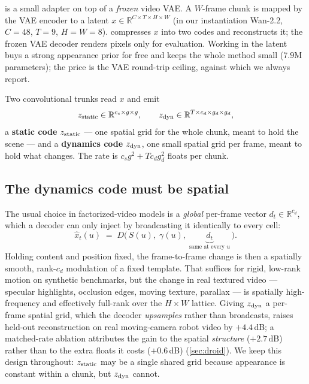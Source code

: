 
\method{} is a small adapter on top of a \emph{frozen} video VAE. A $W$-frame chunk is
mapped by the VAE encoder to a latent $x \in \mathbb{R}^{C\times T\times H\times W}$
(in our instantiation Wan-2.2, $C{=}48$, $T{=}9$, $H{=}W{=}8$). \method{} compresses
$x$ into two codes and reconstructs it; the frozen VAE decoder renders pixels only for
evaluation. Working in the latent buys a strong appearance prior for free and keeps the
whole method small ($7.9$M parameters); the price is the VAE round-trip ceiling, against
which we always report.

Two convolutional trunks read $x$ and emit
\begin{align}
  z_{\mathrm{static}} \in \mathbb{R}^{c_s\times g\times g}, \qquad
  z_{\mathrm{dyn}} \in \mathbb{R}^{T\times c_d\times g_d\times g_d}, \nonumber
\end{align}
a \textbf{static code} $z_{\mathrm{static}}$ --- one spatial grid for the whole chunk, meant to hold the
scene --- and a \textbf{dynamics code} $z_{\mathrm{dyn}}$, one small spatial grid per frame, meant to
hold what changes. The rate is $c_s g^2 + T c_d g_d^2$ floats per chunk.

\subsection{The dynamics code must be spatial}
\label{sec:spatial-dyn}
The usual choice in factorized-video models is a \emph{global} per-frame vector
$d_t \in \mathbb{R}^{c_d}$, which a decoder can only inject by broadcasting it
identically to every cell:
\begin{equation}
  \hat{x}_t(u) \;=\; D\big(\,S(u),\; \gamma(u),\; \underbrace{d_t}_{\text{same at every }u}\,\big).
  \label{eq:global-dyn}
\end{equation}
Holding content and position fixed, the frame-to-frame change is then a spatially
smooth, rank-$c_d$ modulation of a fixed template. That suffices for rigid, low-rank
motion on synthetic benchmarks, but the change in real textured video --- specular
highlights, occlusion edges, moving texture, parallax --- is spatially high-frequency
and effectively full-rank over the $H\times W$ lattice. Giving $z_{\mathrm{dyn}}$ a per-frame spatial
grid, which the decoder \emph{upsamples} rather than broadcasts, raises held-out
reconstruction on real moving-camera robot video by $+4.4$\,dB; a matched-rate ablation
attributes the gain to the spatial \emph{structure} ($+2.7$\,dB) rather than to the extra
floats it costs ($+0.6$\,dB) (\cref{sec:droid}). We keep this design throughout: $z_{\mathrm{static}}$ may
be a single shared grid because appearance is constant within a chunk, but $z_{\mathrm{dyn}}$ cannot.

